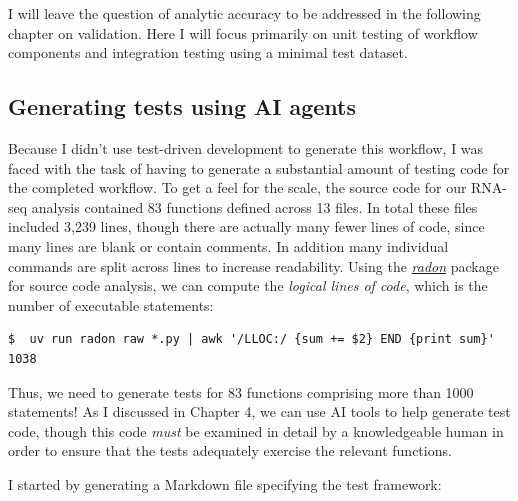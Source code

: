 I will leave the question of analytic accuracy to be addressed in the following chapter on validation. Here I will focus primarily on unit testing of workflow components and integration testing using a minimal test dataset.

\subsection{Generating tests using AI agents}

Because I didn't use test-driven development to generate this workflow, I was faced with the task of having to generate a substantial amount of testing code for the completed workflow. To get a feel for the scale, the source code for our RNA-seq analysis contained 83 functions defined across 13 files.  In total these files included 3,239 lines, though there are actually many fewer lines of code, since many lines are blank or contain comments.  In addition many individual commands are split across lines to increase readability.  Using the \href{https://radon.readthedocs.io/en/latest/}{\textit{radon}} package for source code analysis, we can compute the \textit{logical lines of code}, which is the number of executable statements:

\begin{lstlisting}[style=shellshort]
$  uv run radon raw *.py | awk '/LLOC:/ {sum += $2} END {print sum}'
1038
\end{lstlisting}

Thus, we need to generate tests for 83 functions comprising more than 1000 statements!  As I discussed in Chapter 4, we can use AI tools to help generate test code, though this code \textit{must} be examined in detail by a knowledgeable human in order to ensure that the tests adequately exercise the relevant functions.

I started by generating a Markdown file specifying the test framework:

